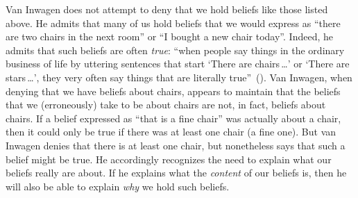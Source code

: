 \documentclass[11pt]{article}
\begin{document}
\begin{spacing}{1.5}
Van Inwagen does not attempt to deny that we hold beliefs like those
listed above.  He admits that many of us hold beliefs that we would
express as ``there are two chairs in the next room'' or ``I bought a
new chair today''.  Indeed, he admits that such beliefs are often {\em
  true}: ``when people say things in the ordinary business of life by
uttering sentences that start `There are chairs\,\ldots ' or `There
are stars\,\ldots ', they very often say things that are literally
true''~(\citeyear[102]{inwagen1995}).  Van Inwagen, when denying that
we have beliefs about chairs, appears to maintain that the beliefs
that we (erroneously) take to be about chairs are not, in fact,
beliefs about chairs.  If a belief expressed as ``that is a fine
chair'' was actually about a chair, then it could only be true if
there was at least one chair (a fine one).  But van Inwagen denies
that there is at least one chair, but nonetheless says that such a
belief might be true.  He accordingly recognizes the need to explain
what our beliefs really are about.  If he explains what the {\em
  content} of our beliefs is, then he will also be able to explain
{\em why} we hold such beliefs.

\ifstandalone
\end{spacing}


\fi
\end{document}
